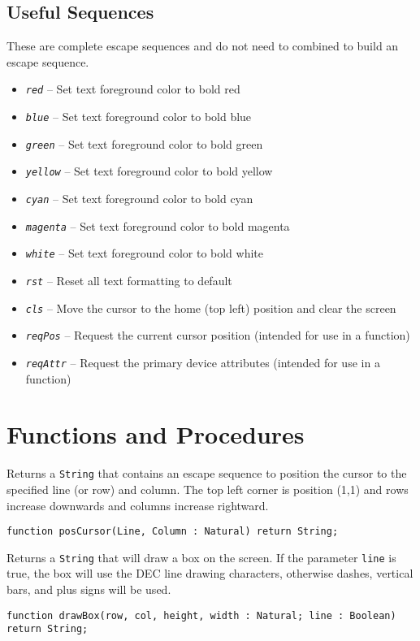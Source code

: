 \documentclass[10pt, openany]{book}
\newcommand{\constant}[1]{\emph{\texttt{#1}}}
\newcommand{\keyword}[1]{\texttt{#1}}
\newcommand{\datatype}[1]{\texttt{#1}}
\begin{document}
\subsection{Useful Sequences}
These are complete escape sequences and do not need to combined to build an escape sequence.
\begin{itemize}
  \item \constant{red} -- Set text foreground color to bold red
  \item \constant{blue} -- Set text foreground color to bold blue
  \item \constant{green} -- Set text foreground color to bold green
  \item \constant{yellow} -- Set text foreground color to bold yellow
  \item \constant{cyan} -- Set text foreground color to bold cyan
  \item \constant{magenta} -- Set text foreground color to bold magenta
  \item \constant{white} -- Set text foreground color to bold white
  \item \constant{rst} -- Reset all text formatting to default
  \item \constant{cls} -- Move the cursor to the home (top left) position and clear the screen
  \item \constant{reqPos} -- Request the current cursor position (intended for use in a function)
  \item \constant{reqAttr} -- Request the primary device attributes (intended for use in a function)
\end{itemize}

\section{Functions and Procedures}

Returns a \datatype{String} that contains an escape sequence to position the cursor to the specified line (or row) and column.  The top left corner is position (1,1) and rows increase downwards and columns increase rightward.
\begin{lstlisting}
function posCursor(Line, Column : Natural) return String;
\end{lstlisting}

Returns a \datatype{String} that will draw a box on the screen.  If the parameter \keyword{line} is true, the box will use the DEC line drawing characters, otherwise dashes, vertical bars, and plus signs will be used.
\begin{lstlisting}
function drawBox(row, col, height, width : Natural; line : Boolean) return String;
\end{lstlisting}
\end{document}
